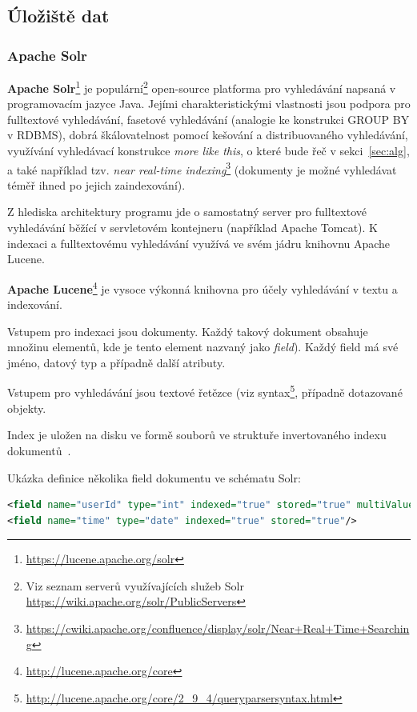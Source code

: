 \documentclass[thesis=M,czech]{FITthesis}[2014/05/07]
\begin{document}
\subsection{Úložiště dat}

\subsubsection{Apache Solr}
\textbf{Apache Solr}\footnote{\url{https://lucene.apache.org/solr}} je populární\footnote{Viz seznam serverů využívajících služeb Solr \url{https://wiki.apache.org/solr/PublicServers}} open-source platforma pro vyhledávání napsaná v programovacím jazyce Java. Jejími charakteristickými vlastnosti jsou podpora pro fulltextové vyhledávání, fasetové vyhledávání (analogie ke konstrukci GROUP BY v RDBMS), dobrá škálovatelnost pomocí kešování a distribuovaného vyhledávání, využívání vyhledávací konstrukce \emph{more like this}, o které bude řeč v sekci~\ref{sec:alg}, a také například tzv. \emph{near real-time indexing}\footnote{\url{https://cwiki.apache.org/confluence/display/solr/Near+Real+Time+Searching}} (dokumenty je možné vyhledávat téměř ihned po jejich zaindexování).

Z hlediska architektury programu jde o samostatný server pro fulltextové vyhledávání běžící v servletovém kontejneru (například Apache Tomcat). K indexaci a fulltextovému vyhledávání využívá ve svém jádru knihovnu Apache Lucene. 

\textbf{Apache Lucene}\footnote{\url{http://lucene.apache.org/core}} je vysoce výkonná knihovna pro účely vyhledávání v textu a indexování.

Vstupem pro indexaci jsou dokumenty. Každý takový dokument obsahuje množinu elementů, kde je tento element nazvaný jako \emph{field}). Každý field má své jméno, datový typ a případně další atributy.

Vstupem pro vyhledávání jsou textové řetězce (viz syntax\footnote{\url{http://lucene.apache.org/core/2_9_4/queryparsersyntax.html}}, případně dotazované objekty.

Index je uložen na disku ve formě souborů ve struktuře invertovaného indexu dokumentů~\cite{wiki:invindex}.

Ukázka definice několika field dokumentu ve schématu Solr:

\begin{lstlisting}[language=xml]
<field name="userId" type="int" indexed="true" stored="true" multiValued="true"/>	
<field name="time" type="date" indexed="true" stored="true"/>
\end{lstlisting}
\end{document}
